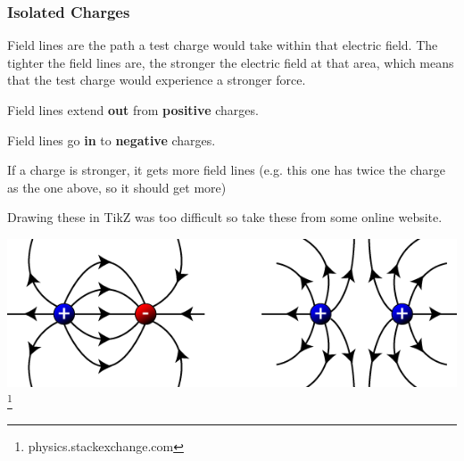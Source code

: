 \documentclass[../main.tex]{subfiles}
\begin{document}
		\subsubsection{Isolated Charges}
		Field lines are the path a test charge would take within that electric field. The tighter the field lines are, the stronger the electric field at that area, which means that the test charge would experience a stronger force.
		
		Field lines extend \textbf{out} from \textbf{positive} charges.
		\begin{center}
		\end{center}
		Field lines go \textbf{in} to \textbf{negative} charges.
		\begin{center}
		\end{center}
		
		If a charge is stronger, it gets more field lines (e.g. this one has twice the charge as the one above, so it should get more)
		\begin{center}
		\end{center}
		
		Drawing these in TikZ was too difficult so take these from some online website.
		\begin{center}
			\includegraphics[width=\linewidth]{graphics/electrostaticsFieldLines}\footnote{physics.stackexchange.com}
		\end{center}
	
\end{document}
